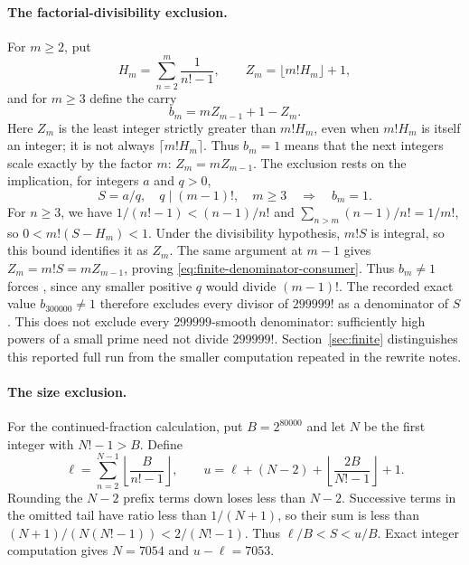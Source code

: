 \documentclass[11pt]{article}
\begin{document}
\paragraph{The factorial-divisibility exclusion.}
For $m\ge2$, put
\[
H_m=\sum_{n=2}^m\frac1{n!-1},\qquad
Z_m=\lfloor m!H_m\rfloor+1,
\]
and for $m\ge3$ define the carry
\[
b_m=mZ_{m-1}+1-Z_m.
\]
Here $Z_m$ is the least integer strictly greater than $m!H_m$, even when
$m!H_m$ is itself an integer; it is not always $\lceil m!H_m\rceil$.
Thus $b_m=1$ means that the next integers scale exactly by the factor $m$:
$Z_m=mZ_{m-1}$.
The exclusion rests on the implication, for integers $a$ and $q>0$,
\begin{equation}
S=a/q,\quad q\mid(m-1)!,\quad m\ge3
\quad\Longrightarrow\quad b_m=1.\label{eq:finite-denominator-consumer}
\end{equation}
For $n\ge3$, we have $1/(n!-1)<(n-1)/n!$ and
$\sum_{n>m}(n-1)/n!=1/m!$, so $0<m!(S-H_m)<1$.
Under the divisibility hypothesis, $m!S$ is integral, so this bound
identifies it as $Z_m$. The same argument at $m-1$ gives
$Z_m=m!S=mZ_{m-1}$, proving \eqref{eq:finite-denominator-consumer}.
Thus $b_m\ne1$ forces
,
since any smaller positive $q$ would divide $(m-1)!$.
The recorded exact value $b_{300000}\ne1$ therefore excludes every divisor of
$299999!$ as a denominator of $S$.
This does not exclude every $299999$-smooth denominator: sufficiently
high powers of a small prime need not divide $299999!$.
Section~\ref{sec:finite} distinguishes this reported full run from the
smaller computation repeated in the rewrite notes.

\paragraph{The size exclusion.}
For the continued-fraction calculation, put $B=2^{80000}$ and let $N$ be
the first integer with $N!-1>B$. Define
\[
 \ell=\sum_{n=2}^{N-1}\left\lfloor\frac B{n!-1}\right\rfloor,
 \qquad
 u=\ell+(N-2)+\left\lfloor\frac{2B}{N!-1}\right\rfloor+1.
\]
Rounding the $N-2$ prefix terms down loses less than $N-2$. Successive
terms in the omitted tail have ratio less than $1/(N+1)$, so their sum
is less than $(N+1)/(N(N!-1))<2/(N!-1)$. Thus $\ell/B<S<u/B$.
Exact integer computation gives $N=7054$ and $u-\ell=7053$.
\end{document}
